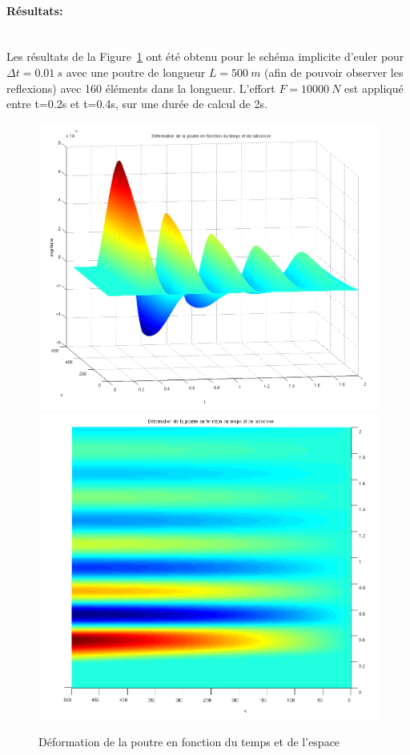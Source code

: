 \documentclass[]{article}
\begin{document}
\paragraph{Résultats:}~\\

Les résultats de la Figure~\ref{defimp} ont été obtenu pour le schéma implicite
d'euler pour $\Delta t=0.01\ s$ avec une poutre de longueur $L=500\ m$ (afin de
pouvoir observer les reflexions) avec 160 éléments dans la longueur. L'effort
$F=10000\ N$ est appliqué entre t=0.2s et t=0.4s, sur une durée de calcul de 2s.

\begin{figure}
\begin{center}
 \includegraphics[scale=0.2]{Figures/3D_def.png}
\includegraphics[scale=0.2]{Figures/3D_def_2.png}
\caption{Déformation de la poutre en fonction du temps et de l'espace}
\label{defimp}
\end{center}
\end{figure}
\end{document}
